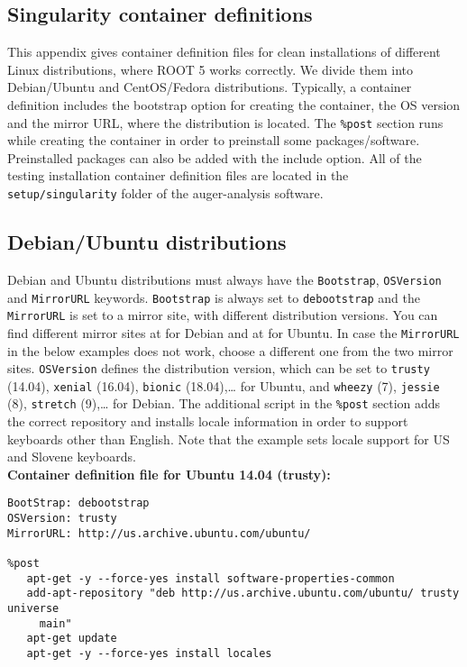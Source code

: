 \documentclass[12pt,a4paper]{report}
\begin{document}
\begin{appendices}
\chapter{Singularity container definitions} \label{app:containers}
{\noindent}This appendix gives container definition files for clean installations of different Linux distributions, where ROOT 5 works correctly. We divide them into Debian/Ubuntu and CentOS/Fedora distributions. Typically, a container definition includes the bootstrap option for creating the container, the OS version and the mirror URL, where the distribution is located. The \texttt{\%post} section runs while creating the container in order to preinstall some packages/software. Preinstalled packages can also be added with the include option. All of the testing installation container definition files are located in the \texttt{setup/singularity} folder of the auger-analysis software.

\section{Debian/Ubuntu distributions}
Debian and Ubuntu distributions must always have the \texttt{Bootstrap}, \texttt{OSVersion} and \texttt{MirrorURL} keywords. \texttt{Bootstrap} is always set to \texttt{debootstrap} and the \texttt{MirrorURL} is set to a mirror site, with different distribution versions. You can find different mirror sites at \cite{debianmirror} for Debian and at \cite{ubuntumirror} for Ubuntu. In case the \texttt{MirrorURL} in the below examples does not work, choose a different one from the two mirror sites. \texttt{OSVersion} defines the distribution version, which can be set to \texttt{trusty} (14.04), \texttt{xenial} (16.04), \texttt{bionic} (18.04),{\dots} for Ubuntu, and \texttt{wheezy} (7), \texttt{jessie} (8), \texttt{stretch} (9),{\dots} for Debian. The additional script in the \texttt{\%post} section adds the correct repository and installs locale information in order to support keyboards other than English. Note that the example sets locale support for US and Slovene keyboards.\\

{\noindent}\textbf{Container definition file for Ubuntu 14.04 (trusty):}
\footnotesize
\begin{verbatim}
BootStrap: debootstrap
OSVersion: trusty
MirrorURL: http://us.archive.ubuntu.com/ubuntu/

%post
   apt-get -y --force-yes install software-properties-common
   add-apt-repository "deb http://us.archive.ubuntu.com/ubuntu/ trusty universe
     main"
   apt-get update
   apt-get -y --force-yes install locales
   

\end{verbatim}
\end{appendices}
\end{document}

